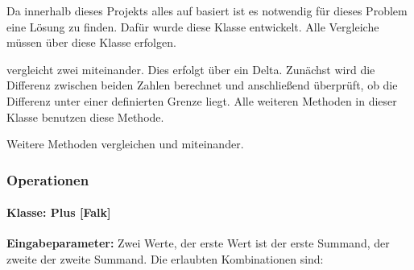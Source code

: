 Da innerhalb dieses Projekts alles auf  basiert ist es notwendig für dieses Problem eine Lösung zu finden. Dafür wurde diese Klasse entwickelt. Alle Vergleiche müssen über diese Klasse erfolgen.

 vergleicht zwei  miteinander. Dies erfolgt über ein Delta. Zunächst wird die Differenz zwischen beiden Zahlen berechnet und anschließend überprüft, ob die Differenz unter einer definierten Grenze liegt. Alle weiteren Methoden in dieser Klasse benutzen diese Methode.

Weitere Methoden vergleichen  und  miteinander.

\subsubsection{Operationen}

\paragraph{Klasse: Plus [Falk]}

\textbf{Eingabeparameter: }Zwei Werte, der erste Wert ist der erste Summand, der zweite der zweite Summand. Die erlaubten Kombinationen sind: 

